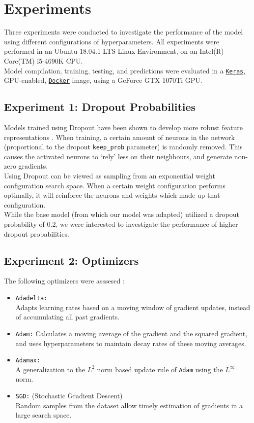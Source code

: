 \documentclass[12pt]{article}
\newcounter{ct}
\begin{document}
\section*{Experiments}

Three experiments were conducted to investigate the performance
of the model using different configurations 
of hyperparameters. All experiments were performed in an Ubuntu 18.04.1 LTS
Linux Environment, on an Intel(R) Core(TM) i5-4690K CPU. \\
Model compilation, training, testing, and predictions were evaluated in 
a \href{https://keras.io/}{\tt Keras}, GPU-enabled, 
\href{https://github.com/keras-team/keras/tree/master/docker}{\tt Docker} 
image, using a GeForce GTX 1070Ti GPU. 

\subsection*{Experiment 1: Dropout Probabilities}
Models trained using Dropout have been shown to develop more robust 
feature representations \cite{c13}. When training, a certain amount of neurons in 
the network (proportional to the dropout {\tt keep\_prob} parameter)
is randomly removed. 
This causes the activated neurons to `rely' less on their neighbours, 
and generate non-zero gradients.
\\ Using Dropout can be viewed as sampling
from an exponential weight configuration search space. 
When a certain weight configuration performs optimally, 
it will reinforce the neurons
and weights which made up that configuration.\\
While the base model (from which our model was adapted) utilized a 
dropout probability of 0.2, we were interested to investigate the performance
of higher dropout probabilities.

\subsection*{Experiment 2: Optimizers}
The following optimizers were asssesed \cite{c11} :
\begin{itemize}
    \item {\tt Adadelta:}\\
    Adapts learning rates based on a moving window of gradient updates,
    instead of accumulating all past gradients.
    \item {\tt Adam:}
    Calculates a moving average of the gradient and the 
    squared gradient, and uses hyperparameters to maintain decay rates
    of these moving averages.
    \item {\tt Adamax:}\\
    A generalization to the $L^2$ norm based update rule of {\tt Adam}
    using the $L^\infty$ norm. \cite{c12}
    \item {\tt SGD:} (Stochastic Gradient Descent)\\
    Random samples from the dataset allow timely estimation of 
    gradients in a large search space.
\end{itemize}
\end{document}
